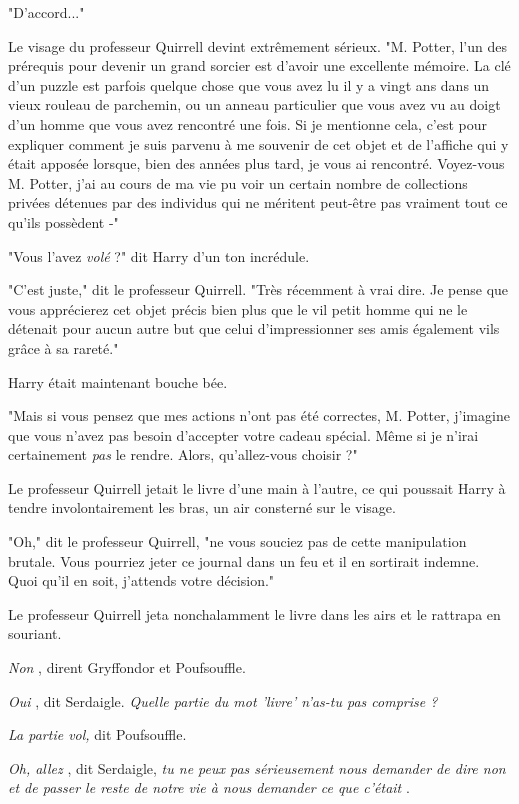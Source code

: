 "D'accord..."

Le visage du professeur Quirrell devint extrêmement sérieux. "M. Potter, l'un des prérequis pour devenir un grand sorcier est d'avoir une excellente mémoire. La clé d'un puzzle est parfois quelque chose que vous avez lu il y a vingt ans dans un vieux rouleau de parchemin, ou un anneau particulier que vous avez vu au doigt d'un homme que vous avez rencontré une fois. Si je mentionne cela, c'est pour expliquer comment je suis parvenu à me souvenir de cet objet et de l'affiche qui y était apposée lorsque, bien des années plus tard, je vous ai rencontré. Voyez-vous M. Potter, j'ai au cours de ma vie pu voir un certain nombre de collections privées détenues par des individus qui ne méritent peut-être pas vraiment tout ce qu'ils possèdent -"

"Vous l'avez \emph{volé}  ?" dit Harry d'un ton incrédule.

"C'est juste," dit le professeur Quirrell. "Très récemment à vrai dire. Je pense que vous apprécierez cet objet précis bien plus que le vil petit homme qui ne le détenait pour aucun autre but que celui d'impressionner ses amis également vils grâce à sa rareté."

Harry était maintenant bouche bée.

"Mais si vous pensez que mes actions n'ont pas été correctes, M. Potter, j'imagine que vous n'avez pas besoin d'accepter votre cadeau spécial. Même si je n'irai certainement \emph{pas}  le rendre. Alors, qu'allez-vous choisir ?"

Le professeur Quirrell jetait le livre d'une main à l'autre, ce qui poussait Harry à tendre involontairement les bras, un air consterné sur le visage.

"Oh," dit le professeur Quirrell, "ne vous souciez pas de cette manipulation brutale. Vous pourriez jeter ce journal dans un feu et il en sortirait indemne. Quoi qu'il en soit, j'attends votre décision."

Le professeur Quirrell jeta nonchalamment le livre dans les airs et le rattrapa en souriant.

\emph{Non} , dirent Gryffondor et Poufsouffle.

\emph{Oui} , dit Serdaigle. \emph{Quelle partie du mot 'livre' n'as-tu pas comprise ?} 

\emph{La partie vol, } dit Poufsouffle.

\emph{Oh, allez} , dit Serdaigle, \emph{tu ne peux pas sérieusement nous demander de dire non et de passer le reste de notre vie à nous demander ce que c'était} .

